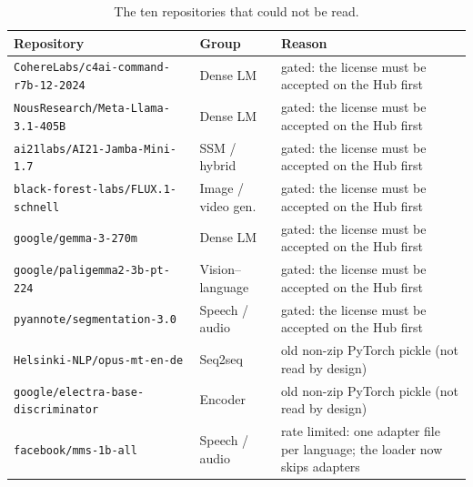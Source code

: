 \begin{table}[H]
\centering
\small
\begin{tabular}{@{}llp{5.9cm}@{}}
\toprule
Repository & Group & Reason \\
\midrule
\texttt{CohereLabs/c4ai-command-r7b-12-2024} & Dense LM & gated: the license must be accepted on the Hub first \\
\texttt{NousResearch/Meta-Llama-3.1-405B} & Dense LM & gated: the license must be accepted on the Hub first \\
\texttt{ai21labs/AI21-Jamba-Mini-1.7} & SSM / hybrid & gated: the license must be accepted on the Hub first \\
\texttt{black-forest-labs/FLUX.1-schnell} & Image / video gen. & gated: the license must be accepted on the Hub first \\
\texttt{google/gemma-3-270m} & Dense LM & gated: the license must be accepted on the Hub first \\
\texttt{google/paligemma2-3b-pt-224} & Vision--language & gated: the license must be accepted on the Hub first \\
\texttt{pyannote/segmentation-3.0} & Speech / audio & gated: the license must be accepted on the Hub first \\
\texttt{Helsinki-NLP/opus-mt-en-de} & Seq2seq & old non-zip PyTorch pickle (not read by design) \\
\texttt{google/electra-base-discriminator} & Encoder & old non-zip PyTorch pickle (not read by design) \\
\texttt{facebook/mms-1b-all} & Speech / audio & rate limited: one adapter file per language; the loader now skips adapters \\
\bottomrule
\end{tabular}
\caption{The ten repositories that could not be read.}
\label{tab:hub-fail}
\end{table}
